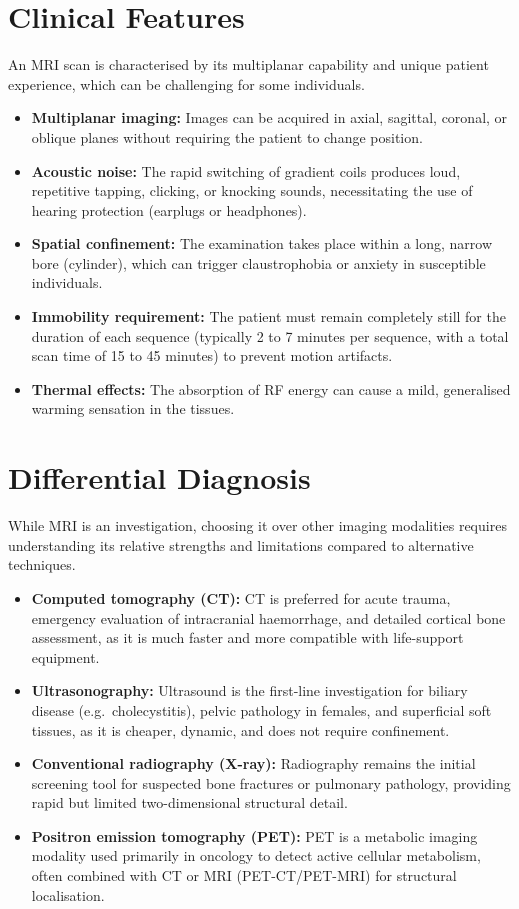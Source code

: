 \section*{Clinical Features}
An MRI scan is characterised by its multiplanar capability and unique patient experience, which can be challenging for some individuals.
\begin{itemize}
    \item \textbf{Multiplanar imaging:} Images can be acquired in axial, sagittal, coronal, or oblique planes without requiring the patient to change position.
    \item \textbf{Acoustic noise:} The rapid switching of gradient coils produces loud, repetitive tapping, clicking, or knocking sounds, necessitating the use of hearing protection (earplugs or headphones).
    \item \textbf{Spatial confinement:} The examination takes place within a long, narrow bore (cylinder), which can trigger claustrophobia or anxiety in susceptible individuals.
    \item \textbf{Immobility requirement:} The patient must remain completely still for the duration of each sequence (typically 2 to 7 minutes per sequence, with a total scan time of 15 to 45 minutes) to prevent motion artifacts.
    \item \textbf{Thermal effects:} The absorption of RF energy can cause a mild, generalised warming sensation in the tissues.
\end{itemize}

\section*{Differential Diagnosis}
While MRI is an investigation, choosing it over other imaging modalities requires understanding its relative strengths and limitations compared to alternative techniques.
\begin{itemize}
    \item \textbf{Computed tomography (CT):} CT is preferred for acute trauma, emergency evaluation of intracranial haemorrhage, and detailed cortical bone assessment, as it is much faster and more compatible with life-support equipment.
    \item \textbf{Ultrasonography:} Ultrasound is the first-line investigation for biliary disease (e.g.\ cholecystitis), pelvic pathology in females, and superficial soft tissues, as it is cheaper, dynamic, and does not require confinement.
    \item \textbf{Conventional radiography (X-ray):} Radiography remains the initial screening tool for suspected bone fractures or pulmonary pathology, providing rapid but limited two-dimensional structural detail.
    \item \textbf{Positron emission tomography (PET):} PET is a metabolic imaging modality used primarily in oncology to detect active cellular metabolism, often combined with CT or MRI (PET-CT/PET-MRI) for structural localisation.
\end{itemize}


